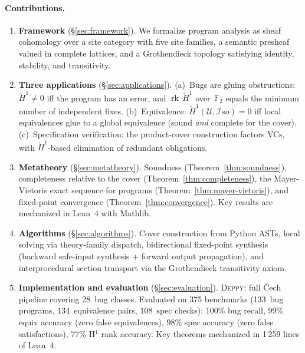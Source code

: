 \documentclass[acmsmall,screen]{acmart}
\theoremstyle{remark}
\newcommand{\Hc}[1]{\check{H}^{#1}}
\newcommand{\Iso}{\mathcal{I}\mathit{so}}
\newcommand{\rk}{\operatorname{rk}}
\newcommand{\GF}{\mathbb{F}}
\begin{document}
\paragraph{Contributions.}
\begin{enumerate}[leftmargin=*,nosep]
\item \textbf{Framework} (\S\ref{sec:framework}).
  We formalize program analysis as sheaf cohomology over a site
  category with five site families, a semantic presheaf valued in
  complete lattices, and a Grothendieck topology satisfying identity,
  stability, and transitivity.

\item \textbf{Three applications} (\S\ref{sec:applications}).
  (a)~Bugs are gluing obstructions: $\Hc{1} \neq 0$ iff the program
  has an error, and $\rk\,\Hc{1}$ over~$\GF_2$ equals the minimum
  number of independent fixes.
  (b)~Equivalence: $\Hc{1}(\mathcal{U}, \Iso) = 0$ iff local
  equivalences glue to a global equivalence (sound \emph{and} complete
  for the cover).
  (c)~Specification verification: the product-cover construction
  factors VCs, with $\Hc{1}$-based elimination of redundant obligations.

\item \textbf{Metatheory} (\S\ref{sec:metatheory}).
  Soundness (Theorem~\ref{thm:soundness}), completeness relative to the
  cover (Theorem~\ref{thm:completeness}), the Mayer-Vietoris exact
  sequence for programs (Theorem~\ref{thm:mayer-vietoris}), and
  fixed-point convergence (Theorem~\ref{thm:convergence}).
  Key results are mechanized in Lean~4 with Mathlib.

\item \textbf{Algorithms} (\S\ref{sec:algorithms}).
  Cover construction from Python ASTs, local solving via theory-family
  dispatch, bidirectional fixed-point synthesis (backward safe-input
  synthesis + forward output propagation), and interprocedural section
  transport via the Grothendieck transitivity axiom.

\item \textbf{Implementation and evaluation} (\S\ref{sec:evaluation}).
  \textsc{Deppy}: full \v{C}ech pipeline covering 28~bug classes.
  Evaluated on 375 benchmarks (133~bug programs, 134~equivalence
  pairs, 108~spec checks): 100\% bug recall, 99\% equiv accuracy
  (zero false equivalences), 98\% spec accuracy (zero false
  satisfactions), 77\% H$^1$ rank accuracy.
  Key theorems mechanized in 1\,259 lines of Lean~4.
\end{enumerate}
\end{document}

